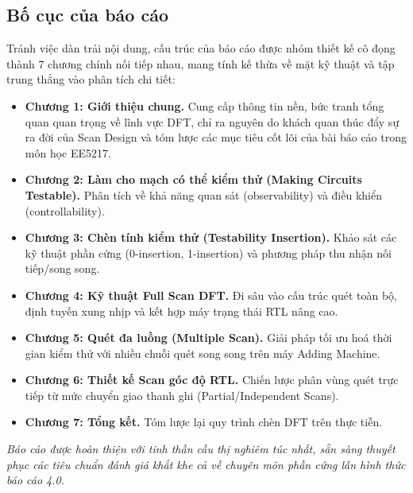 \subsection{Bố cục của báo cáo}
Tránh việc dàn trải nội dung, cấu trúc của báo cáo được nhóm thiết kế cô đọng thành 7 chương chính nối tiếp nhau, mang tính kế thừa về mặt kỹ thuật và tập trung thẳng vào phân tích chi tiết:
\begin{itemize}
    \item \textbf{Chương 1: Giới thiệu chung.} Cung cấp thông tin nền, bức tranh tổng quan quan trọng về lĩnh vực DFT, chỉ ra nguyên do khách quan thúc đẩy sự ra đời của Scan Design và tóm lược các mục tiêu cốt lõi của bài báo cáo trong môn học EE5217.
    \item \textbf{Chương 2: Làm cho mạch có thể kiểm thử (Making Circuits Testable).} Phân tích về khả năng quan sát (observability) và điều khiển (controllability).
    \item \textbf{Chương 3: Chèn tính kiểm thử (Testability Insertion).} Khảo sát các kỹ thuật phần cứng (0-insertion, 1-insertion) và phương pháp thu nhận nối tiếp/song song.
    \item \textbf{Chương 4: Kỹ thuật Full Scan DFT.} Đi sâu vào cấu trúc quét toàn bộ, định tuyến xung nhịp và kết hợp máy trạng thái RTL nâng cao.
    \item \textbf{Chương 5: Quét đa luồng (Multiple Scan).} Giải pháp tối ưu hoá thời gian kiểm thử với nhiều chuỗi quét song song trên máy Adding Machine.
    \item \textbf{Chương 6: Thiết kế Scan góc độ RTL.} Chiến lược phân vùng quét trực tiếp từ mức chuyển giao thanh ghi (Partial/Independent Scans).
    \item \textbf{Chương 7: Tổng kết.} Tóm lược lại quy trình chèn DFT trên thực tiễn.
\end{itemize}

\vspace{1.5cm}
\begin{flushright}
\textit{Báo cáo được hoàn thiện với tinh thần cầu thị nghiêm túc nhất, sẵn sàng thuyết phục các tiêu chuẩn đánh giá khắt khe cả về chuyên môn phần cứng lẫn hình thức báo cáo 4.0.}
\end{flushright}

